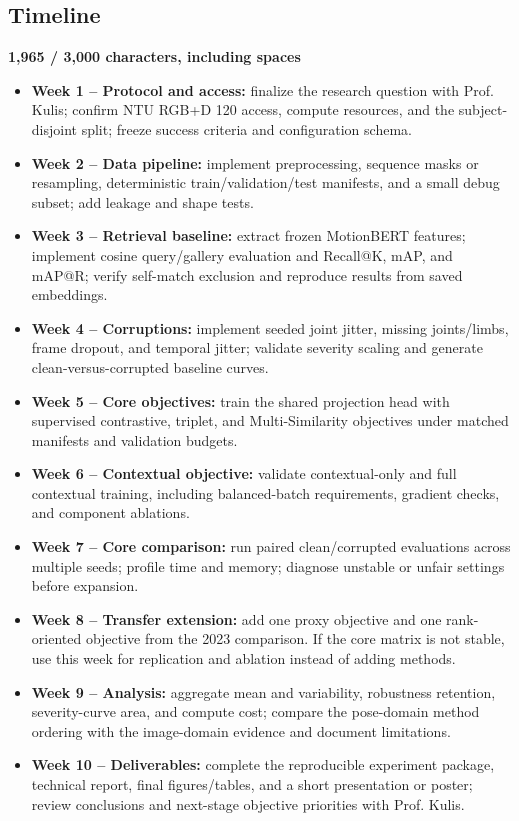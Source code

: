 \documentclass[11pt,letterpaper]{article}
\newcommand{\CharCount}[2]{%
  \begin{flushright}
    \vspace{-7pt}
    {\color{Muted}\bfseries\footnotesize #1 / #2 characters, including spaces}
  \end{flushright}
  \vspace{-3pt}
}
\begin{document}
\subsection*{Timeline}
\CharCount{1,965}{3,000}

\begin{itemize}
  \item \textbf{\color{DarkAccent}Week 1 -- Protocol and access:} finalize the research question with Prof. Kulis; confirm NTU RGB+D 120 access, compute resources, and the subject-disjoint split; freeze success criteria and configuration schema.
  \item \textbf{\color{DarkAccent}Week 2 -- Data pipeline:} implement preprocessing, sequence masks or resampling, deterministic train/validation/test manifests, and a small debug subset; add leakage and shape tests.
  \item \textbf{\color{DarkAccent}Week 3 -- Retrieval baseline:} extract frozen MotionBERT features; implement cosine query/gallery evaluation and Recall@K, mAP, and mAP@R; verify self-match exclusion and reproduce results from saved embeddings.
  \item \textbf{\color{DarkAccent}Week 4 -- Corruptions:} implement seeded joint jitter, missing joints/limbs, frame dropout, and temporal jitter; validate severity scaling and generate clean-versus-corrupted baseline curves.
  \item \textbf{\color{DarkAccent}Week 5 -- Core objectives:} train the shared projection head with supervised contrastive, triplet, and Multi-Similarity objectives under matched manifests and validation budgets.
  \item \textbf{\color{DarkAccent}Week 6 -- Contextual objective:} validate contextual-only and full contextual training, including balanced-batch requirements, gradient checks, and component ablations.
  \item \textbf{\color{DarkAccent}Week 7 -- Core comparison:} run paired clean/corrupted evaluations across multiple seeds; profile time and memory; diagnose unstable or unfair settings before expansion.
  \item \textbf{\color{DarkAccent}Week 8 -- Transfer extension:} add one proxy objective and one rank-oriented objective from the 2023 comparison. If the core matrix is not stable, use this week for replication and ablation instead of adding methods.
  \item \textbf{\color{DarkAccent}Week 9 -- Analysis:} aggregate mean and variability, robustness retention, severity-curve area, and compute cost; compare the pose-domain method ordering with the image-domain evidence and document limitations.
  \item \textbf{\color{DarkAccent}Week 10 -- Deliverables:} complete the reproducible experiment package, technical report, final figures/tables, and a short presentation or poster; review conclusions and next-stage objective priorities with Prof. Kulis.
\end{itemize}
\end{document}
